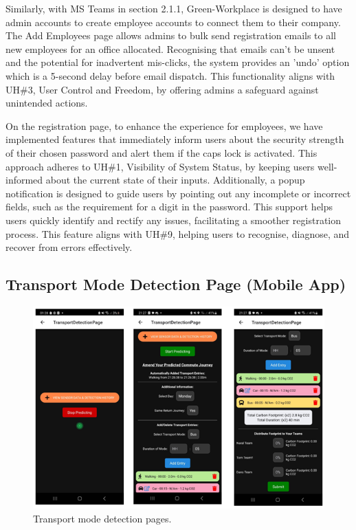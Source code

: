 \documentclass{l4proj}
\begin{document}
Similarly, with MS Teams in section 2.1.1, Green-Workplace is designed to have admin accounts to create employee accounts to connect them to their company. The Add Employees page allows admins to bulk send registration emails to all new employees for an office allocated. Recognising that emails can’t be unsent and the potential for inadvertent mis-clicks, the system provides an 'undo' option which is a 5-second delay before email dispatch. This functionality aligns with UH\#3, User Control and Freedom, by offering admins a safeguard against unintended actions.

On the registration page, to enhance the experience for employees, we have implemented features that immediately inform users about the security strength of their chosen password and alert them if the caps lock is activated. This approach adheres to UH\#1, Visibility of System Status, by keeping users well-informed about the current state of their inputs. Additionally, a popup notification is designed to guide users by pointing out any incomplete or incorrect fields, such as the requirement for a digit in the password. This support helps users quickly identify and rectify any issues, facilitating a smoother registration process. This feature aligns with UH\#9, helping users to recognise, diagnose, and recover from errors effectively.


\subsection{Transport Mode Detection Page (Mobile App)}

\begin{figure}[ht]
  \centering
  \includegraphics[width=\linewidth]{images/transport mode detection pages.png}
  \caption{Transport mode detection pages.}
  \label{fig:transportmodedetection}
\end{figure}
\end{document}
